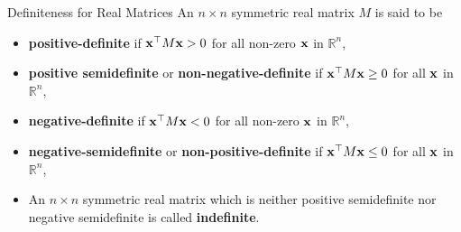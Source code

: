 \begin{definition}{Definiteness for Real Matrices}{}
\label{definitions-for-real-matrices}
An \(n \times n\) symmetric real matrix \(M\) is said to be
\begin{itemize}
\item  \textbf{positive-definite} if \(\mathbf{x}^\top  M\mathbf{x} > 0\) for all non-zero
\(\mathbf{x}\) in \(\mathbb{R}^n\), 
%
\item 
\textbf{positive semidefinite} or \textbf{non-negative-definite} if
\(\mathbf{x}^\top  M\mathbf{x} \geq 0\) for all \(\mathbf{x}\) in \(\mathbb{R}^n\), 
%
\item 
\textbf{negative-definite} if \(\mathbf{x}^\top  M\mathbf{x} < 0\) for all non-zero
\(\mathbf{x}\) in \(\mathbb{R}^n\), 
%
\item 
\textbf{negative-semidefinite} or \textbf{non-positive-definite} if
\(\mathbf{x}^\top  M\mathbf{x} \leq 0\) for all \(\mathbf{x}\) in \(\mathbb{R}^n\),
%
\item An \(n \times n\) symmetric real matrix which is neither positive
semidefinite nor negative semidefinite is called \textbf{indefinite}.
\end{itemize}
\end{definition}
%
%
%
%
%
